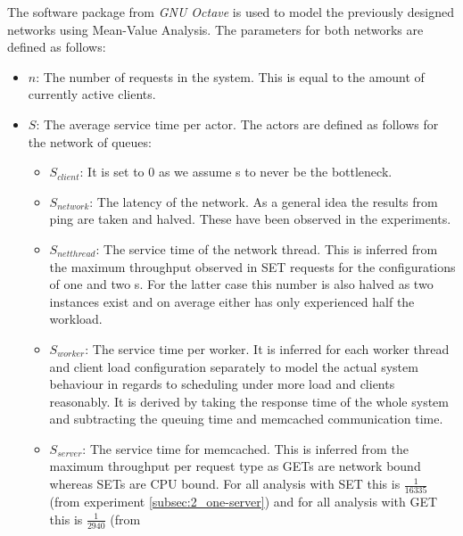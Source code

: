             The software package  from \emph{GNU Octave} is used to model the previously designed networks
            using Mean-Value Analysis. The parameters for both networks are defined as follows:
            \begin{itemize}
                \item $n$: The number of requests in the system. This is equal to the amount of currently active
                      clients.
                \item $S$: The average service time per actor. The actors are defined as follows for the network of
                      queues:
                      \begin{itemize}
                          \item $S_{client}$: It is set to 0 as we assume \cli{}s to never be the bottleneck.
                          \item $S_{network}$: The latency of the network. As a general idea the results from ping are
                                taken and halved. These have been observed in the experiments.
                          \item $S_{netthread}$: The service time of the network thread. This is inferred from the
                                maximum throughput observed in SET requests for the configurations of one and two
                                \mw{}s. For the latter case this number is also halved as two instances exist and on
                                average either has only experienced half the workload.
                          \item $S_{worker}$: The service time per worker. It is inferred for each worker thread and
                                client load configuration separately to model the actual system behaviour in regards to
                                scheduling under more load and clients reasonably. It is derived by taking the response
                                time of the whole system and subtracting the queuing time and memcached communication
                                time.
                          \item $S_{server}$: The service time for memcached. This is inferred from the maximum
                                throughput per request type as GETs are network bound whereas SETs are CPU bound. For
                                all analysis with SET this is $\tfrac{1}{16335}$ (from experiment
                                \ref{subsec:2_one-server}) and for all analysis with GET this is $\tfrac{1}{2940}$ (from

\end{itemize}
\end{itemize}
